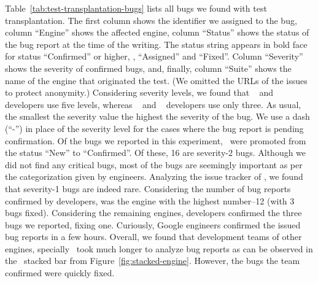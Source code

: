 \documentclass[sigconf,review, anonymous]{acmart}
\begin{document}
Table~\ref{tab:test-transplantation-bugs} lists all bugs we found with
test transplantation. The first column shows the identifier we
assigned to the bug, column ``Engine'' shows the
affected engine, column ``Status'' shows the status of the bug report
at the time of the writing. The status string appears in bold face for
status ``Confirmed'' or higher, \ie{}, ``Assigned'' and ``Fixed''.
Column ``Severity'' shows the severity of confirmed bugs, and,
finally, column ``Suite'' shows the name of the engine that originated
the test.  (We omitted the URLs of the issues to protect anonymity.)
Considering severity levels, we found that \jsc{}~\cite{jsc-severity}
and \smonkey{}~\cite{mozilla-severity} developers use five levels,
whereas \chakra{}~\cite{chakra-severity} and
\veight{}~\cite{v8-severity} developers use only three. As usual, the
smallest the severity value the highest the severity of the bug. We
use a dash (``-'') in place of the severity level for the cases where
the bug report is pending confirmation. Of the
\noBugsTransplantation{} bugs we reported in this experiment,
\noBugsTransplantationConfirmed\ were promoted from the status ``New''
to ``Confirmed''. Of these, 16 are severity-2 bugs.  Although we did
not find any critical bugs, most of the bugs are seemingly important
as per the categorization given by engineers. Analyzing the issue
tracker of \chakra, we found that severity-1 bugs are indeed
rare. Considering the number of bug reports confirmed by developers,
\chakra{} was the engine with the highest number--12 (with 3 bugs
fixed). Considering the remaining engines, \veight{} developers
confirmed the three bugs we reported, fixing one. Curiously, Google
engineers confirmed the issued bug reports in a few hours. Overall, we
found that development teams of other engines, specially \jsc\, took
much longer to analyze bug reports as can be observed in the
\jsc\ stacked bar from Figure~\ref{fig:stacked-engine}. 
However, the bugs the \jsc{} team confirmed were quickly fixed.

\end{document}
